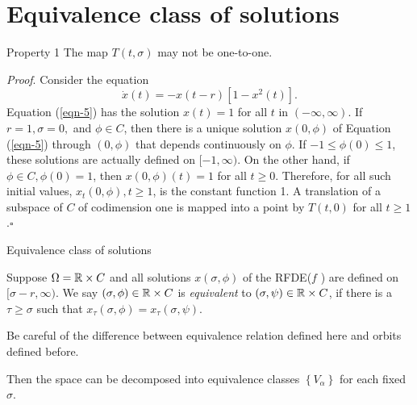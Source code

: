 \section{Equivalence class of solutions}
\begin{frame}[t]
  \begin{alertblock}{Property 1}
    The map $T(t,\sigma)$ may not be one-to-one.
  \end{alertblock}
  {\noindent \itshape Proof}. Consider the equation
  \begin{equation}\label{eqn-5}
    \dot{x}(t)=-x(t-r)[1-x^2(t)].
  \end{equation} 
  Equation (\ref{eqn-5}) has the solution $x(t)=1$ for all $t$ in $(-\infty,\infty)$. If $r=1,\sigma=0,$ and $\phi \in C$, then there is a unique solution $x(0,\phi)$ of Equation (\ref{eqn-5}) through $(0,\phi)$ that depends continuously on $\phi$. If $-1\le \phi(0)\le 1$, these solutions are actually defined on $[-1,\infty)$. On the other hand, if $\phi \in C, \phi(0)=1$, then $x(0,\phi)(t)=1$ for all $t\ge 0$. Therefore, for all such initial values, $x_t(0,\phi),t\ge 1$, is the constant function 1. A translation of a subspace of $C$ of codimension one is mapped into a point by $T(t,0)$ for all $t\ge 1$.\hfill $\square$ \par
\end{frame}

\begin{frame}[t]{Equivalence class of solutions}
  \begin{definition}
    Suppose $\Omega=\mathbb{R}\times C$ and all solutions $x(\sigma,\phi)$ of the RFDE($f$ ) are defined on $[\sigma-r,\infty)$. We say $(\sigma,\phi)\in \mathbb{R}\times C$ is \textit{equivalent} to $(\sigma,\psi)\in \mathbb{R}\times C$, if there is a $\tau \ge \sigma$ such that $x_{\tau }(\sigma,\phi)=x_{\tau }(\sigma,\psi)$.
  \end{definition}
  Be careful of the difference between equivalence relation defined here and orbits defined before.

  Then the space can be decomposed into equivalence classes $\left\{V_\alpha\right\} $ for each fixed $\sigma$. 
\end{frame}

\begin{frame}[t]
  \begin{figure}
    \centering
  \end{figure}
\end{frame}

